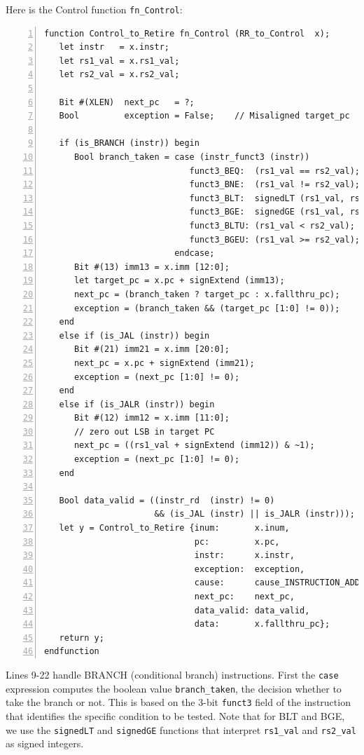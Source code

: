 Here is the Control function \verb|fn_Control|:

{\small
\begin{Verbatim}[frame=single, numbers=left]
function Control_to_Retire fn_Control (RR_to_Control  x);
   let instr   = x.instr;
   let rs1_val = x.rs1_val;
   let rs2_val = x.rs2_val;

   Bit #(XLEN)  next_pc   = ?;
   Bool         exception = False;    // Misaligned target_pc

   if (is_BRANCH (instr)) begin
      Bool branch_taken = case (instr_funct3 (instr))
                             funct3_BEQ:  (rs1_val == rs2_val);
                             funct3_BNE:  (rs1_val != rs2_val);
                             funct3_BLT:  signedLT (rs1_val, rs2_val);
                             funct3_BGE:  signedGE (rs1_val, rs2_val);
                             funct3_BLTU: (rs1_val < rs2_val);
                             funct3_BGEU: (rs1_val >= rs2_val);
                          endcase;
      Bit #(13) imm13 = x.imm [12:0];
      let target_pc = x.pc + signExtend (imm13);
      next_pc = (branch_taken ? target_pc : x.fallthru_pc);
      exception = (branch_taken && (target_pc [1:0] != 0));
   end
   else if (is_JAL (instr)) begin
      Bit #(21) imm21 = x.imm [20:0];
      next_pc = x.pc + signExtend (imm21);
      exception = (next_pc [1:0] != 0);
   end
   else if (is_JALR (instr)) begin
      Bit #(12) imm12 = x.imm [11:0];
      // zero out LSB in target PC
      next_pc = ((rs1_val + signExtend (imm12)) & ~1);
      exception = (next_pc [1:0] != 0);
   end

   Bool data_valid = ((instr_rd  (instr) != 0)
                      && (is_JAL (instr) || is_JALR (instr)));
   let y = Control_to_Retire {inum:       x.inum,
                              pc:         x.pc,
                              instr:      x.instr,
                              exception:  exception,
                              cause:      cause_INSTRUCTION_ADDRESS_MISALIGNED,
                              next_pc:    next_pc,
                              data_valid: data_valid,
                              data:       x.fallthru_pc};
   return y;
endfunction
\end{Verbatim}
}

Lines 9-22 handle BRANCH (conditional branch) instructions.  First the
\verb|case| expression computes the boolean value \verb|branch_taken|,
the decision whether to take the branch or not.  This is based on the
3-bit \verb|funct3| field of the instruction that identifies the
specific condition to be tested.  Note that for BLT and BGE, we use
the \verb|signedLT| and \verb|signedGE| functions that interpret
\verb|rs1_val| and \verb|rs2_val| as signed integers.

